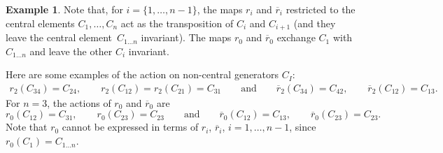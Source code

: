 \documentclass[pdftex]{sigma}
\numberwithin{equation}{section}
\theoremstyle{definition}
\newtheorem{exam}[theo]{Example}
\newcommand{\rb}{\overline{r}}
\begin{document}
\begin{exam}
Note that, for $i=\{1,\dots,n-1\}$, the maps $r_i$ and $\rb_i$ restricted to the central elements $C_1,\dots,C_n$ act as the transposition of $C_i$ and $C_{i+1}$ (and they leave the central element~$C_{1\dots n}$ invariant). The maps $r_0$ and $\rb_0$ exchange $C_1$ with $C_{1\dots n}$ and leave the other $C_i$ invariant.

Here are some examples of the action on non-central generators $C_I$:
\begin{gather*}
r_2(C_{34})=C_{24} ,\qquad\! r_2(C_{12})=r_2(C_{21})=C_{31}\qquad\! \text{and}\qquad\! \rb_2(C_{34})=C_{42} ,\qquad\! \rb_2(C_{12})=C_{13}.
\end{gather*}
For $n=3$, the actions of $r_0$ and $\rb_0$ are
\[
r_0(C_{12})=C_{31} ,\qquad r_0(C_{23})=C_{23}\qquad \text{and}\qquad \rb_0(C_{12})=C_{13} ,\qquad \rb_0(C_{23})=C_{23}.
\]
Note that $r_0$ cannot be expressed in terms of $r_i$, $\rb_i$, $i=1,\dots,n-1$, since $r_0(C_1)=C_{1\dots n}$.
\end{exam}
\end{document}
